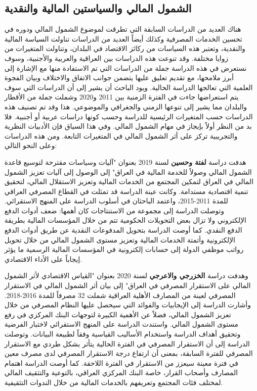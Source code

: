 \documentclass[10pt,a4paper]{report}
\begin{document}
\begin{doublespacing}
\section{الشمول المالي والسياستين المالية والنقدية}
هناك العديد من الدراسات السابقة التي تطرقت لموضوع الشمول المالي ودوره في تحسين الخدمات المصرفية وكذلك أيضاً العديد من الدراسات تناولت السياسة المالية والنقدية، وتعتبر هذه السياسات من ركائز الاقتصاد في البلدان، وتناولت المتغيرات من زوايا مختلفة. وقد تنوعت هذه الدراسات بين العراقية والعربية والأجنبية، وسوف نستعرض في هذه الدراسة جملة من الدراسات التي تم الاستفادة منها مع الإشارة إلى أبرز ملامحها، مع تقديم تعليق عليها يتضمن جوانب الاتفاق والاختلاف وبيان الفجوة العلمية التي تعالجها الدراسة الحالية. ويود الباحث أن يشير إلى أن الدراسات التي سوف يتم استعراضها جاءت في الفترة الزمنية بين 2011 و2020 وشملت جملة من الأقطار والبلدان مما يشير إلى تنوعها الزمني والجغرافي والموضوعي. هذا وقد تم تصنيف هذه الدراسات حسب المتغيرات الرئيسية للدراسة وحسب كونها دراسات عربية أو أجنبية. فلا بد من النظر أولاً بإيجاز في مهام الشمول المالي. وفي هذا السياق فإن الأدبيات النظرية والتجريبية تركز على أثر الشمول المالي في المتغيرات التابعة. ومن هذه الدراسات وعلى النحو التالي:

هدفت دراسة {\textbf{لفتة وحسين}} لسنة 2019 بعنوان "آليات وسياسات مقترحة لتوسيع قاعدة الشمول المالي وصولاً للخدمة المالية في العراق" إلى الوصول إلى آليات تعزيز الشمول المالي في العراق لتمكين المجتمع من الخدمات المالية وتعزيز الاستقلال المالي، لتحقيق تنمية اقتصادية مستدامة. وكانت عينة الدراسة قد تمثلت في القطاع المصرفي العراقي للمدة 2011-2015، واعتمد الباحثان في أسلوب الدراسة على المنهج الاستقرائي. وتوصلت الدراسة إلى مجموعة من الاستنتاجات كان أهمها: ضعف أدوات الدفع الإلكتروني ولا تزال بعض التحويلات الحكومية تتم من خلال المؤسسات المالية بطريقة الدفع النقدي. كما أوصت الدراسة بتحويل المدفوعات النقدية عن طريق أدوات الدفع الإلكترونية وأتمتة الخدمات المالية وتعزيز مستوى الشمول المالي من خلال تحويل رواتب موظفي الدولة إلى حسابات إلكترونية في المؤسسات المالية الرسمية ما يؤثر إيجاباً على الأداء الاقتصادي.

وهدفت دراسة {\textbf{الخزرجي والاعرجي}} لسنة 2020 بعنوان "القياس الاقتصادي لأثر الشمول المالي على الاستقرار المصرفي في العراق" إلى بيان أثر الشمول المالي في الاستقرار المصرفي لعينة من المصارف الأهلية العراقية شملت 32 مصرفاً للمدة 2016-2018. وأشارت الدراسة إلى الإيجابيات والفوائد التي سيحصل عليها النظام المصرفي من خلال تعزيز الشمول المالي، فضلاً عن الأهمية الكبيرة لتوجهات البنك المركزي في رفع مستوى الشمول المالي. واستندت الدراسة على المنهج الاستقرائي لاختبار الفرضية وتحقيق أهداف الدراسة واستخدام الأساليب القياسية وفقاً لطبيعة البيانات. وتوصلت الدراسة إلى أن الاستقرار المصرفي في الفترة الحالية يتأثر بشكل طردي مع الاستقرار المصرفي للفترة السابقة، بمعنى أن ارتفاع درجة الاستقرار المصرفي لدى مصرف معين في فترة معينة سيعزز من الاستقرار في الفترة اللاحقة. كما أوصت الدراسة اهتمام المصارف وأصحاب القرار، خاصة البنك المركزي العراقي، بالتوعية والتثقيف المالي لمختلف فئات المجتمع وتعريفهم بالخدمات المالية من خلال الندوات التثقيفية.


\end{doublespacing}
\end{document}
